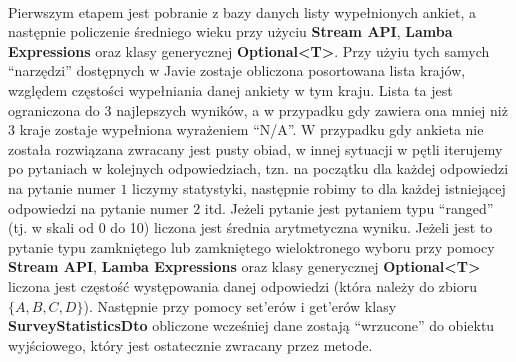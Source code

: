 \documentclass[a4paper]{article}
\begin{document}
\paragraph{}
Pierwszym etapem jest pobranie z bazy danych listy wypełnionych ankiet, a następnie policzenie średniego wieku przy użyciu \textbf{Stream API}, \textbf{Lamba Expressions} oraz klasy generycznej \textbf{Optional<T>}. Przy użyiu tych samych ``narzędzi'' dostępnych w Javie zostaje obliczona posortowana lista krajów, względem częstości wypełniania danej ankiety w tym kraju. Lista ta jest ograniczona do $3$ najlepszych wyników, a w przypadku gdy zawiera ona mniej niż $3$ kraje zostaje wypełniona wyrażeniem ``N/A''. W przypadku gdy ankieta nie została rozwiązana zwracany jest pusty obiad, w innej sytuacji w pętli iterujemy po pytaniach w kolejnych odpowiedziach, tzn. na początku dla każdej odpowiedzi na pytanie numer $1$ liczymy statystyki, następnie robimy to dla każdej istniejącej odpowiedzi na pytanie numer $2$ itd. Jeżeli pytanie jest pytaniem typu ``ranged'' (tj. w skali od 0 do 10) liczona jest średnia arytmetyczna wyniku. Jeżeli jest to pytanie typu zamkniętego lub zamkniętego wieloktronego wyboru przy pomocy \textbf{Stream API}, \textbf{Lamba Expressions} oraz klasy generycznej \textbf{Optional<T>} liczona jest częstość występowania danej odpowiedzi (która należy do zbioru $\{A,B,C,D\}$). Następnie przy pomocy set'erów i get'erów klasy \textbf{SurveyStatisticsDto} obliczone wcześniej dane zostają ``wrzucone'' do obiektu wyjściowego, który jest ostatecznie zwracany przez metode.
\end{document}

